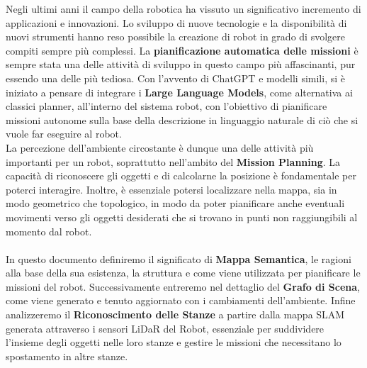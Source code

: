 
Negli ultimi anni il campo della robotica ha vissuto un significativo incremento di applicazioni e innovazioni. Lo sviluppo di nuove tecnologie e la disponibilità di nuovi strumenti hanno reso possibile la creazione di robot in grado di svolgere compiti sempre più complessi. La \textbf{pianificazione automatica delle missioni} è sempre stata una delle attività di sviluppo in questo campo più affascinanti, pur essendo una delle più tediosa. Con l'avvento di ChatGPT e modelli simili, si è iniziato a pensare di integrare i \textbf{Large Language Models}, come alternativa ai classici planner, all'interno del sistema robot, con l'obiettivo di pianificare missioni autonome sulla base della descrizione in linguaggio naturale di ciò che si vuole far eseguire al robot.\\
La percezione dell'ambiente circostante è dunque una delle attività più importanti per un robot, soprattutto nell'ambito del \textbf{Mission Planning}. La capacità di riconoscere gli oggetti e di calcolarne la posizione è fondamentale per poterci interagire. Inoltre, è essenziale potersi localizzare nella mappa, sia in modo geometrico che topologico, in modo da poter pianificare anche eventuali movimenti verso gli oggetti desiderati che si trovano in punti non raggiungibili al momento dal robot.\\\\
In questo documento definiremo il significato di \textbf{Mappa Semantica}, le ragioni alla base della sua esistenza, la struttura e come viene utilizzata per pianificare le missioni del robot. Successivamente entreremo nel dettaglio del \textbf{Grafo di Scena}, come viene generato e tenuto aggiornato con i cambiamenti dell'ambiente. Infine analizzeremo il \textbf{Riconoscimento delle Stanze} a partire dalla mappa SLAM generata attraverso i sensori LiDaR del Robot, essenziale per suddividere l'insieme degli oggetti nelle loro stanze e gestire le missioni che necessitano lo spostamento in altre stanze.